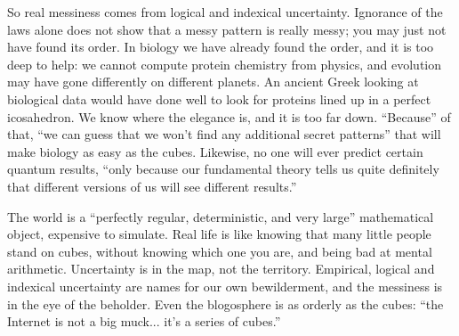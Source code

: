 So real messiness comes from logical and indexical uncertainty. Ignorance of the laws alone does not show that a messy pattern is really messy; you may just not have found its order. In biology we have already found the order, and it is too deep to help: we cannot compute protein chemistry from physics, and evolution may have gone differently on different planets. An ancient Greek looking at biological data would have done well to look for proteins lined up in a perfect icosahedron. We know where the elegance is, and it is too far down. ``Because'' of that, ``we can guess that we won't find any additional secret patterns'' that will make biology as easy as the cubes.  Likewise, no one will ever predict certain quantum results, ``only because our fundamental theory tells us quite definitely that different versions of us will see different results.'' 

The world is a ``perfectly regular, deterministic, and very large'' mathematical object, expensive to simulate. Real life is like knowing that many little people stand on cubes, without knowing which one you are, and being bad at mental arithmetic. Uncertainty is in the map, not the territory. Empirical, logical and indexical uncertainty are names for our own bewilderment, and the messiness is in the eye of the beholder. Even the blogosphere is as orderly as the cubes: ``the Internet is not a big muck... it's a series of cubes.''
